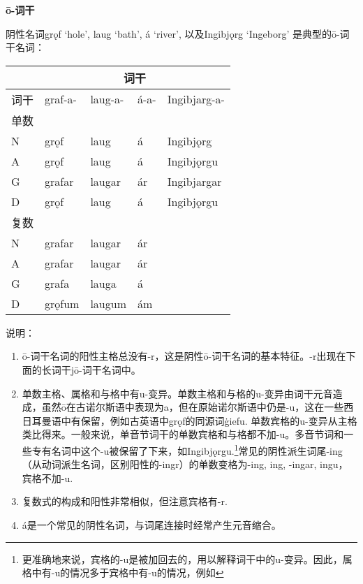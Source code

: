 \textbf{ō-词干}

阴性名词grǫf `hole', laug `bath', á `river‌', 以及Ingibjǫrg `Ingeborg‌'
是典型的ō-词干名词：

\begin{longtable}{lllll}
  \toprule
     & \multicolumn{4}{c}{词干}                                 \\
  \midrule
  \endhead
  \bottomrule
  \endfoot
  词干 & graf-a-                & laug-a- & á-a- & Ingibjarg-a- \\
  单数 &                        &         &      &              \\
  N  & grǫf                   & laug    & á    & Ingibjǫrg    \\
  A  & grǫf                   & laug    & á    & Ingibjǫrgu   \\
  G  & grafar                 & laugar  & ár   & Ingibjargar  \\
  D  & grǫf                   & laug    & á    & Ingibjǫrgu   \\
  复数 &                        &         &      &              \\
  N  & grafar                 & laugar  & ár   &              \\
  A  & grafar                 & laugar  & ár   &              \\
  G  & grafa                  & lauga   & á    &              \\
  D  & grǫfum                 & laugum  & ám   &              \\
\end{longtable}

说明：

\begin{enumerate}
  \def\labelenumi{\arabic{enumi})}
  \item
        ō-词干名词的阳性主格总没有-r，这是阴性ō-词干名词的基本特征。-r出现在下面的长词干jō-词干名词中。
  \item
        单数主格、属格和与格中有u-变异。单数主格和与格的u-变异由词干元音造成，虽然ō在古诺尔斯语中表现为a，但在原始诺尔斯语中仍是-u，这在一些西日耳曼语中有保留，例如古英语中grǫf的同源词ġiefu.
        单数宾格的u-变异从主格类比得来。一般来说，单音节词干的单数宾格和与格都不加-u。多音节词和一些专有名词中这个-u被保留了下来，如Ingibjǫrgu.\footnote{更准确地来说，宾格的-u是被加回去的，用以解释词干中的u-变异。因此，属格中有-u的情况多于宾格中有-u的情况，例如}常见的阴性派生词尾-ing（从动词派生名词，区别阳性的-ingr）的单数变格为-ing,
        ing, -ingar, ingu，宾格不加-u.
  \item
        复数式的构成和阳性非常相似，但注意宾格有-r.
  \item
        á是一个常见的阴性名词，与词尾连接时经常产生元音缩合。
\end{enumerate}

